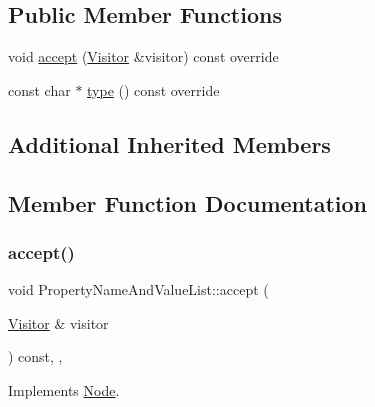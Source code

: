 \subsection*{Public Member Functions}
\begin{DoxyCompactItemize}
\item 
void \hyperlink{struct_property_name_and_value_list_a9de0000cc5d14bb2c24d643fe3dab043}{accept} (\hyperlink{struct_visitor}{Visitor} \&visitor) const override
\item 
const char $\ast$ \hyperlink{struct_property_name_and_value_list_af7fee32b31b1e3c163de8344988307c8}{type} () const override
\end{DoxyCompactItemize}
\subsection*{Additional Inherited Members}


\subsection{Member Function Documentation}
\mbox{\label{struct_property_name_and_value_list_a9de0000cc5d14bb2c24d643fe3dab043}} 
\subsubsection{\texorpdfstring{accept()}{accept()}}
{\footnotesize\ttfamily void Property\+Name\+And\+Value\+List\+::accept (\begin{DoxyParamCaption}\item[{\hyperlink{struct_visitor}{Visitor} \&}]{visitor }\end{DoxyParamCaption}) const\hspace{0.3cm}{\ttfamily [inline]}, {\ttfamily [override]}, {\ttfamily [virtual]}}



Implements \hyperlink{struct_node_a10bd7af968140bbf5fa461298a969c71}{Node}.

\mbox{\label{struct_property_name_and_value_list_af7fee32b31b1e3c163de8344988307c8}} 
